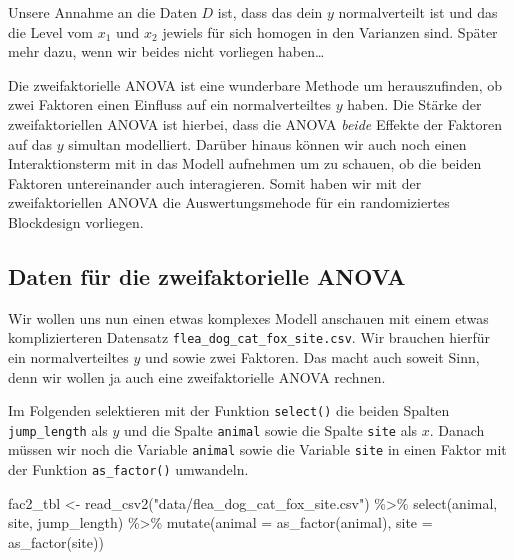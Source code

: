 \documentclass[
  letterpaper,
  DIV=11,
  oneside]{scrreport}
\newenvironment{Shaded}{\begin{snugshade}}{\end{snugshade}}
\newcommand{\AttributeTok}[1]{\textcolor[rgb]{0.40,0.45,0.13}{#1}}
\newcommand{\FunctionTok}[1]{\textcolor[rgb]{0.28,0.35,0.67}{#1}}
\newcommand{\NormalTok}[1]{\textcolor[rgb]{0.00,0.23,0.31}{#1}}
\newcommand{\OtherTok}[1]{\textcolor[rgb]{0.00,0.23,0.31}{#1}}
\newcommand{\SpecialCharTok}[1]{\textcolor[rgb]{0.37,0.37,0.37}{#1}}
\newcommand{\StringTok}[1]{\textcolor[rgb]{0.13,0.47,0.30}{#1}}
\begin{document}
Unsere Annahme an die Daten \(D\) ist, dass das dein \(y\)
normalverteilt ist und das die Level vom \(x_1\) und \(x_2\) jewiels für
sich homogen in den Varianzen sind. Später mehr dazu, wenn wir beides
nicht vorliegen haben\ldots{}

Die zweifaktorielle ANOVA ist eine wunderbare Methode um herauszufinden,
ob zwei Faktoren einen Einfluss auf ein normalverteiltes \(y\) haben.
Die Stärke der zweifaktoriellen ANOVA ist hierbei, dass die ANOVA
\emph{beide} Effekte der Faktoren auf das \(y\) simultan modelliert.
Darüber hinaus können wir auch noch einen Interaktionsterm mit in das
Modell aufnehmen um zu schauen, ob die beiden Faktoren untereinander
auch interagieren. Somit haben wir mit der zweifaktoriellen ANOVA die
Auswertungsmehode für ein randomiziertes Blockdesign vorliegen.

\hypertarget{daten-fuxfcr-die-zweifaktorielle-anova}{%
\subsection{Daten für die zweifaktorielle
ANOVA}\label{daten-fuxfcr-die-zweifaktorielle-anova}}

Wir wollen uns nun einen etwas komplexes Modell anschauen mit einem
etwas komplizierteren Datensatz \texttt{flea\_dog\_cat\_fox\_site.csv}.
Wir brauchen hierfür ein normalverteiltes \(y\) und sowie zwei Faktoren.
Das macht auch soweit Sinn, denn wir wollen ja auch eine zweifaktorielle
ANOVA rechnen.

Im Folgenden selektieren mit der Funktion \texttt{select()} die beiden
Spalten \texttt{jump\_length} als \(y\) und die Spalte \texttt{animal}
sowie die Spalte \texttt{site} als \(x\). Danach müssen wir noch die
Variable \texttt{animal} sowie die Variable \texttt{site} in einen
Faktor mit der Funktion \texttt{as\_factor()} umwandeln.

\begin{Shaded}
\begin{Highlighting}[]
\NormalTok{fac2\_tbl }\OtherTok{\textless{}{-}} \FunctionTok{read\_csv2}\NormalTok{(}\StringTok{"data/flea\_dog\_cat\_fox\_site.csv"}\NormalTok{) }\SpecialCharTok{\%\textgreater{}\%} 
  \FunctionTok{select}\NormalTok{(animal, site, jump\_length) }\SpecialCharTok{\%\textgreater{}\%} 
  \FunctionTok{mutate}\NormalTok{(}\AttributeTok{animal =} \FunctionTok{as\_factor}\NormalTok{(animal),}
         \AttributeTok{site =} \FunctionTok{as\_factor}\NormalTok{(site))}
\end{Highlighting}
\end{Shaded}
\end{document}
